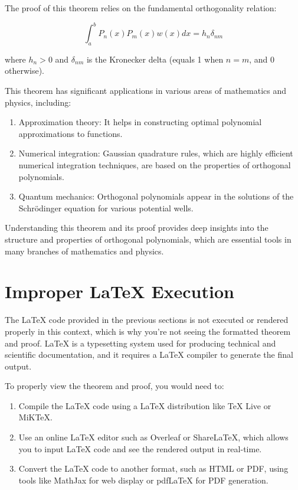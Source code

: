 \documentclass{article}
\begin{document}
The proof of this theorem relies on the fundamental orthogonality relation:

\[
\int_a^bP_n(x)P_m(x)w(x)dx=h_n\delta_{nm}
\]

where $h_n>0$ and $\delta_{nm}$ is the Kronecker delta (equals 1 when $n=m$, and 0 otherwise).

This theorem has significant applications in various areas of mathematics and physics, including:

\begin{enumerate}
\item Approximation theory: It helps in constructing optimal polynomial approximations to functions.
\item Numerical integration: Gaussian quadrature rules, which are highly efficient numerical integration techniques, are based on the properties of orthogonal polynomials.
\item Quantum mechanics: Orthogonal polynomials appear in the solutions of the Schrödinger equation for various potential wells.
\end{enumerate}

Understanding this theorem and its proof provides deep insights into the structure and properties of orthogonal polynomials, which are essential tools in many branches of mathematics and physics.

\section{Improper LaTeX Execution}
The LaTeX code provided in the previous sections is not executed or rendered properly in this context, which is why you're not seeing the formatted theorem and proof. LaTeX is a typesetting system used for producing technical and scientific documentation, and it requires a LaTeX compiler to generate the final output.

To properly view the theorem and proof, you would need to:

\begin{enumerate}
\item Compile the LaTeX code using a LaTeX distribution like TeX Live or MiKTeX.
\item Use an online LaTeX editor such as Overleaf or ShareLaTeX, which allows you to input LaTeX code and see the rendered output in real-time.
\item Convert the LaTeX code to another format, such as HTML or PDF, using tools like MathJax for web display or pdfLaTeX for PDF generation.
\end{enumerate}
\end{document}
